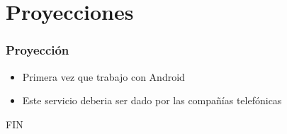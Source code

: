 \documentclass{beamer}
\begin{document}
\section{Proyecciones}
\frame
{
	\frametitle{Proyección}

	\begin{itemize}
	\pause
	\item Primera vez que trabajo con Android
	\pause
	\item Este servicio deberia ser dado por las compañías telefónicas
	\end{itemize}
}

\frame
{
	FIN
}
\end{document}
